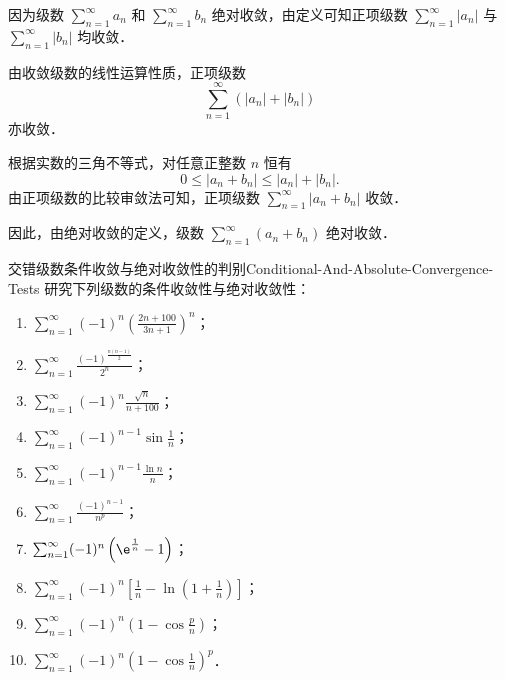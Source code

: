 \begin{myproof}
    因为级数 $\sum_{n=1}^\infty a_n$ 和 $\sum_{n=1}^\infty b_n$ 绝对收敛，由定义可知正项级数 $\sum_{n=1}^\infty |a_n|$ 与 $\sum_{n=1}^\infty |b_n|$ 均收敛．

    由收敛级数的线性运算性质，正项级数
    \begin{equation}
        \sum_{n=1}^\infty (|a_n| + |b_n|)
    \end{equation}
    亦收敛．

    根据实数的三角不等式，对任意正整数 $n$ 恒有
    \begin{equation}
        0 \leqslant |a_n + b_n| \leqslant |a_n| + |b_n|.
    \end{equation}
    由正项级数的比较审敛法可知，正项级数 $\sum_{n=1}^\infty |a_n + b_n|$ 收敛．

    因此，由绝对收敛的定义，级数 $\sum_{n=1}^\infty (a_n + b_n)$ 绝对收敛．
\end{myproof}

\begin{problem}{交错级数条件收敛与绝对收敛性的判别}{Conditional-And-Absolute-Convergence-Tests}
    研究下列级数的条件收敛性与绝对收敛性：
    \begin{enumerate}
        \item $\sum_{n=1}^\infty (-1)^n \left(\frac{2n + 100}{3n + 1}\right)^n$；
        \item $\sum_{n=1}^\infty \frac{(-1)^{\frac{n(n-1)}{2}}}{2^n}$；
        \item $\sum_{n=1}^\infty (-1)^n \frac{\sqrt{n}}{n + 100}$；
        \item $\sum_{n=1}^\infty (-1)^{n-1} \sin \frac{1}{n}$；
        \item $\sum_{n=1}^\infty (-1)^{n-1} \frac{\ln n}{n}$；
        \item $\sum_{n=1}^\infty \frac{(-1)^{n-1}}{n^p}$；
        \item $\sum_{n=1}^\infty (-1)^n \left(\e^{\frac{1}{n}} - 1\right)$；
        \item $\sum_{n=1}^\infty (-1)^n \left[ \frac{1}{n} - \ln\left(1 + \frac{1}{n}\right) \right]$；
        \item $\sum_{n=1}^\infty (-1)^n \left(1 - \cos \frac{p}{n}\right)$；
        \item $\sum_{n=1}^\infty (-1)^n \left(1 - \cos \frac{1}{n}\right)^p$．
    \end{enumerate}
\end{problem}

